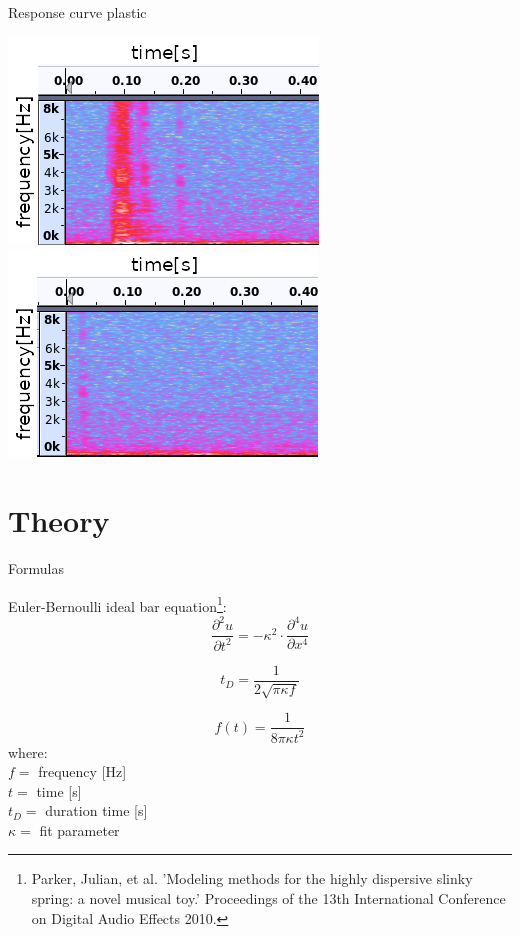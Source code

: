 \documentclass{beamer}
\begin{document}
	\begin{frame}{Response curve plastic}
		\begin{center}
			\includegraphics [scale=0.68]{images/plastic.png}
			\includegraphics [scale=0.68]{images/plastic_echo.png}
		\end{center}
	\end{frame}

\section {Theory}
	\begin{frame}{Formulas}
		
		Euler-Bernoulli ideal bar equation\footnote{ \tiny{ Parker, Julian, et al. 'Modeling methods for the highly dispersive slinky spring: a
novel musical toy.' Proceedings of the 13th International Conference on Digital
Audio Effects 2010.}}:
		\begin{equation}
			\frac{\partial ^2 u }{\partial t^2} = -\kappa ^2 \cdot  \frac{\partial^4 u}  {\partial x^4}  
		\end{equation}
		
		
		\begin{equation}
			t_D = \frac{1}{2 \sqrt{\pi  \kappa  f}}
		\end{equation}
		
		\begin{equation}
			f(t) = \frac{1} {8 \pi \kappa t^2}
		\end{equation}
		where: \\
		$f =$ frequency [Hz] \\
		$t =$ time [s] \\
		$t_D =$ duration time [s] \\
		$\kappa =$ fit parameter
				
	\end{frame}
\end{document}
